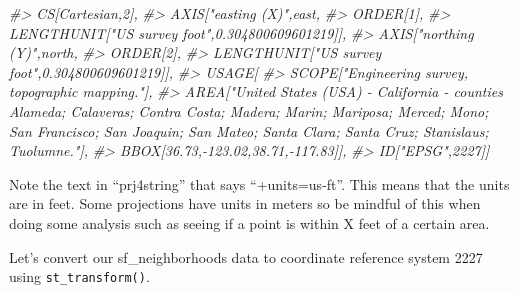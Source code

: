 \documentclass[
]{krantz}
\makeatletter
\newenvironment{Shaded}{\begin{snugshade}}{\end{snugshade}}
\newcommand{\CommentTok}[1]{\textcolor[rgb]{0.37,0.37,0.37}{\textit{#1}}}
\newenvironment{kframe}{%
\medskip{}
\setlength{\fboxsep}{.8em}
 \def\at@end@of@kframe{}%
 \ifinner\ifhmode%
  \def\at@end@of@kframe{\end{minipage}}%
  \begin{minipage}{\columnwidth}%
 \fi\fi%
 \def\FrameCommand##1{\hskip\@totalleftmargin \hskip-\fboxsep
 \colorbox{shadecolor}{##1}\hskip-\fboxsep
     \hskip-\linewidth \hskip-\@totalleftmargin \hskip\columnwidth}%
 \MakeFramed {\advance\hsize-\width
   \@totalleftmargin\z@ \linewidth\hsize
   \@setminipage}}%
 {\par\unskip\endMakeFramed%
 \at@end@of@kframe}
\renewenvironment{Shaded}{\begin{kframe}}{\end{kframe}}
\makeatother
\begin{document}
\begin{Shaded}
\begin{Highlighting}[]
\CommentTok{\#\textgreater{}     CS[Cartesian,2],}
\CommentTok{\#\textgreater{}         AXIS["easting (X)",east,}
\CommentTok{\#\textgreater{}             ORDER[1],}
\CommentTok{\#\textgreater{}             LENGTHUNIT["US survey foot",0.304800609601219]],}
\CommentTok{\#\textgreater{}         AXIS["northing (Y)",north,}
\CommentTok{\#\textgreater{}             ORDER[2],}
\CommentTok{\#\textgreater{}             LENGTHUNIT["US survey foot",0.304800609601219]],}
\CommentTok{\#\textgreater{}     USAGE[}
\CommentTok{\#\textgreater{}         SCOPE["Engineering survey, topographic mapping."],}
\CommentTok{\#\textgreater{}         AREA["United States (USA) {-} California {-} counties Alameda; Calaveras; Contra Costa; Madera; Marin; Mariposa; Merced; Mono; San Francisco; San Joaquin; San Mateo; Santa Clara; Santa Cruz; Stanislaus; Tuolumne."],}
\CommentTok{\#\textgreater{}         BBOX[36.73,{-}123.02,38.71,{-}117.83]],}
\CommentTok{\#\textgreater{}     ID["EPSG",2227]]}
\end{Highlighting}
\end{Shaded}

Note the text in ``prj4string'' that says ``+units=us-ft''. This means that the units are in feet. Some projections have units in meters so be mindful of this when doing some analysis such as seeing if a point is within X feet of a certain area.

Let's convert our sf\_neighborhoods data to coordinate reference system 2227 using \texttt{st\_transform()}.
\end{document}

